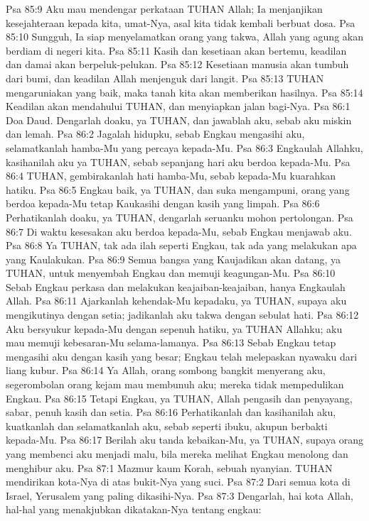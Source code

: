 Psa 85:9  Aku mau mendengar perkataan TUHAN Allah; Ia menjanjikan kesejahteraan kepada kita, umat-Nya, asal kita tidak kembali berbuat dosa.
Psa 85:10  Sungguh, Ia siap menyelamatkan orang yang takwa, Allah yang agung akan berdiam di negeri kita.
Psa 85:11  Kasih dan kesetiaan akan bertemu, keadilan dan damai akan berpeluk-pelukan.
Psa 85:12  Kesetiaan manusia akan tumbuh dari bumi, dan keadilan Allah menjenguk dari langit.
Psa 85:13  TUHAN mengaruniakan yang baik, maka tanah kita akan memberikan hasilnya.
Psa 85:14  Keadilan akan mendahului TUHAN, dan menyiapkan jalan bagi-Nya.
Psa 86:1  Doa Daud. Dengarlah doaku, ya TUHAN, dan jawablah aku, sebab aku miskin dan lemah.
Psa 86:2  Jagalah hidupku, sebab Engkau mengasihi aku, selamatkanlah hamba-Mu yang percaya kepada-Mu.
Psa 86:3  Engkaulah Allahku, kasihanilah aku ya TUHAN, sebab sepanjang hari aku berdoa kepada-Mu.
Psa 86:4  TUHAN, gembirakanlah hati hamba-Mu, sebab kepada-Mu kuarahkan hatiku.
Psa 86:5  Engkau baik, ya TUHAN, dan suka mengampuni, orang yang berdoa kepada-Mu tetap Kaukasihi dengan kasih yang limpah.
Psa 86:6  Perhatikanlah doaku, ya TUHAN, dengarlah seruanku mohon pertolongan.
Psa 86:7  Di waktu kesesakan aku berdoa kepada-Mu, sebab Engkau menjawab aku.
Psa 86:8  Ya TUHAN, tak ada ilah seperti Engkau, tak ada yang melakukan apa yang Kaulakukan.
Psa 86:9  Semua bangsa yang Kaujadikan akan datang, ya TUHAN, untuk menyembah Engkau dan memuji keagungan-Mu.
Psa 86:10  Sebab Engkau perkasa dan melakukan keajaiban-keajaiban, hanya Engkaulah Allah.
Psa 86:11  Ajarkanlah kehendak-Mu kepadaku, ya TUHAN, supaya aku mengikutinya dengan setia; jadikanlah aku takwa dengan sebulat hati.
Psa 86:12  Aku bersyukur kepada-Mu dengan sepenuh hatiku, ya TUHAN Allahku; aku mau memuji kebesaran-Mu selama-lamanya.
Psa 86:13  Sebab Engkau tetap mengasihi aku dengan kasih yang besar; Engkau telah melepaskan nyawaku dari liang kubur.
Psa 86:14  Ya Allah, orang sombong bangkit menyerang aku, segerombolan orang kejam mau membunuh aku; mereka tidak mempedulikan Engkau.
Psa 86:15  Tetapi Engkau, ya TUHAN, Allah pengasih dan penyayang, sabar, penuh kasih dan setia.
Psa 86:16  Perhatikanlah dan kasihanilah aku, kuatkanlah dan selamatkanlah aku, sebab seperti ibuku, akupun berbakti kepada-Mu.
Psa 86:17  Berilah aku tanda kebaikan-Mu, ya TUHAN, supaya orang yang membenci aku menjadi malu, bila mereka melihat Engkau menolong dan menghibur aku.
Psa 87:1  Mazmur kaum Korah, sebuah nyanyian. TUHAN mendirikan kota-Nya di atas bukit-Nya yang suci.
Psa 87:2  Dari semua kota di Israel, Yerusalem yang paling dikasihi-Nya.
Psa 87:3  Dengarlah, hai kota Allah, hal-hal yang menakjubkan dikatakan-Nya tentang engkau:
